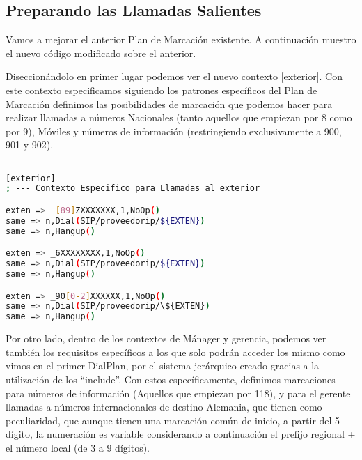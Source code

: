\newpage

\color[rgb]{0,0,0}

\subsection{Preparando las Llamadas Salientes}

Vamos a mejorar el anterior Plan de Marcación existente. A continuación muestro el nuevo código modificado sobre el anterior.

Diseccionándolo en primer lugar podemos ver el nuevo contexto [exterior]. Con este contexto especificamos siguiendo los patrones específicos del Plan de Marcación definimos las posibilidades de marcación que podemos hacer para realizar llamadas a números Nacionales (tanto aquellos que empiezan por 8 como por 9), Móviles y números de información (restringiendo exclusivamente a 900, 901 y 902). 

\begin{lstlisting}[language=bash,title={/etc/asterisk/extensions.conf}]

[exterior]
; --- Contexto Especifico para Llamadas al exterior

exten => _[89]ZXXXXXXX,1,NoOp()
same => n,Dial(SIP/proveedorip/${EXTEN})
same => n,Hangup()

exten => _6XXXXXXXX,1,NoOp()
same => n,Dial(SIP/proveedorip/${EXTEN})
same => n,Hangup()

exten => _90[0-2]XXXXXX,1,NoOp()
same => n,Dial(SIP/proveedorip/\${EXTEN})
same => n,Hangup()

\end{lstlisting}

Por otro lado, dentro de los contextos de Mánager y gerencia, podemos ver también los requisitos específicos a los que solo podrán acceder los mismo como vimos en el primer DialPlan, por el sistema jerárquico creado gracias a la utilización de los ``include''. Con estos específicamente, definimos marcaciones para números de información (Aquellos que empiezan por 118), y para el gerente llamadas a números internacionales de destino Alemania, que tienen como peculiaridad, que aunque tienen una marcación común de inicio, a partir del 5 dígito, la numeración es variable considerando a continuación el prefijo regional + el número local (de 3 a 9 dígitos).

